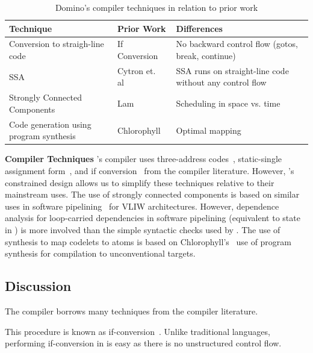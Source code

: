 \begin{table}[!t]
  \begin{scriptsize}
    \begin{tabular}{|p{}|p{}|p{}|}
  \hline
  Technique & Prior Work & Differences \\
  \hline
  Conversion to straigh-line code & If Conversion~\cite{if_conversion} & No backward control flow (gotos, break, continue) \\
  \hline
  SSA & Cytron et. al~\cite{ssa} & SSA runs on straight-line code without any control flow \\
  \hline
  Strongly Connected Components & Lam~\cite{lam} & Scheduling in space vs. time \\ %
  \hline
  Code generation using program synthesis & Chlorophyll~\cite{chlorophyll} & Optimal mapping \\
  \hline
  \end{tabular}
  \end{scriptsize}
  \caption{Domino's compiler techniques in relation to prior work}
  \label{tab:prior_compiler}
\end{table}

\textbf{Compiler Techniques}
\pktlanguage's compiler uses three-address codes~\cite{tac}, static-single
assignment form~\cite{ssa}, and if conversion~\cite{if_conversion} from the
compiler literature. However, \pktlanguage's constrained design allows us to
simplify these techniques relative to their mainstream uses.  The use of
strongly connected components is based on similar uses in software
pipelining~\cite{software_pipelining} for VLIW architectures. However,
dependence analysis for loop-carried dependencies in software pipelining
(equivalent to state in \pktlanguage) is more involved than the simple
syntactic checks used by \pktlanguage. The use of synthesis to map codelets to
atoms is based on Chlorophyll's~\cite{chlorophyll} use of program synthesis for
compilation to unconventional targets.

\subsection{Discussion}
The \pktlanguage compiler borrows many techniques from the compiler literature.

This procedure is known as
if-conversion~\cite{if_conversion}. Unlike traditional languages, performing
if-conversion in \pktlanguage is easy as there is no unstructured control
flow.  
